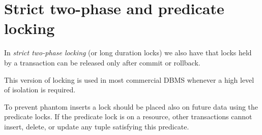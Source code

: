 \section{Strict two-phase and predicate locking}

\begin{definition}
    In \emph{strict two-phase locking} (or long duration locks) we also have that locks held by a transaction can be released only after commit or rollback.
\end{definition}
This version of locking is used in most commercial DBMS whenever a high level of isolation is required. 

To prevent phantom inserts a lock should be placed also on future data using the predicate locks. If the predicate lock is on a resource, other transactions cannot insert, delete, 
or update any tuple satisfying this predicate. 